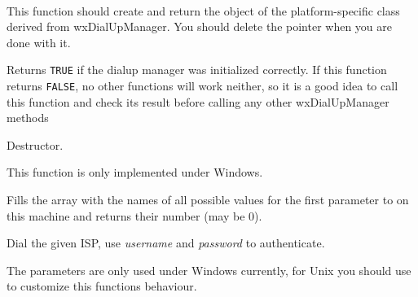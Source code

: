 
\\


\label{wxdialupmanagercreate}


This function should create and return the object of the platform-specific
class derived from wxDialUpManager. You should delete the pointer when you are
done with it.

\label{wxdialupmanagerisok}


Returns {\tt TRUE} if the dialup manager was initialized correctly. If this
function returns {\tt FALSE}, no other functions will work neither, so it is a
good idea to call this function and check its result before calling any other
wxDialUpManager methods

\label{wxdialupmanagerdtor}


Destructor.

\label{wxdialupmanagergetispnames}


This function is only implemented under Windows.

Fills the array with the names of all possible values for the first
parameter to  on this machine and returns
their number (may be $0$).

\label{wxdialupmanagerdial}


Dial the given ISP, use {\it username} and {\it password} to authenticate.

The parameters are only used under Windows currently, for Unix you should use 
 to customize this
functions behaviour.

